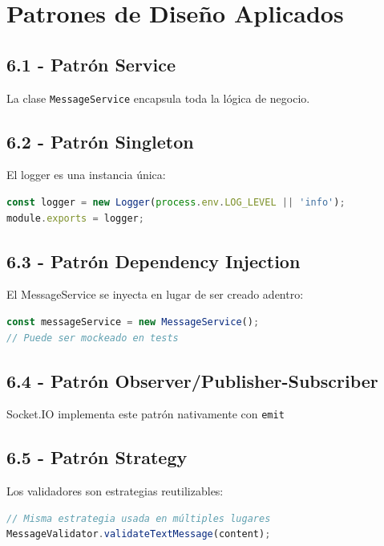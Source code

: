 \documentclass[12pt,a4paper]{article}
\begin{document}
\newpage

\section{Patrones de Diseño Aplicados}

\subsection{6.1 - Patrón Service}
La clase \texttt{MessageService} encapsula toda la lógica de negocio.

\subsection{6.2 - Patrón Singleton}
El logger es una instancia única:
\begin{lstlisting}[language=JavaScript]
const logger = new Logger(process.env.LOG_LEVEL || 'info');
module.exports = logger;
\end{lstlisting}

\subsection{6.3 - Patrón Dependency Injection}
El MessageService se inyecta en lugar de ser creado adentro:
\begin{lstlisting}[language=JavaScript]
const messageService = new MessageService();
// Puede ser mockeado en tests
\end{lstlisting}

\subsection{6.4 - Patrón Observer/Publisher-Subscriber}
Socket.IO implementa este patrón nativamente con \texttt{emit}

\subsection{6.5 - Patrón Strategy}
Los validadores son estrategias reutilizables:
\begin{lstlisting}[language=JavaScript]
// Misma estrategia usada en múltiples lugares
MessageValidator.validateTextMessage(content);
\end{lstlisting}
\end{document}
